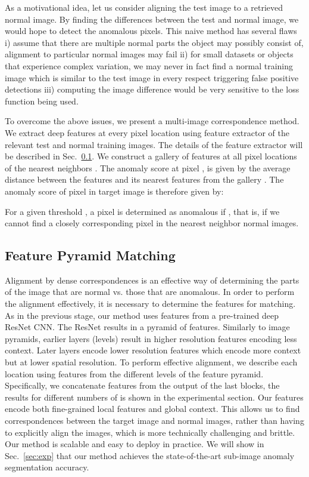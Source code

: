 \documentclass[runningheads]{llncs}
\begin{document}
As a motivational idea, let us consider aligning the test image to a retrieved normal image. By finding the differences between the test and normal image, we would hope to detect the anomalous pixels. This naive method has several flaws i) assume that there are multiple normal parts the object may possibly consist of, alignment to particular normal images may fail ii) for small datasets or objects that experience complex variation, we may never in fact find a normal training image which is similar to the test image in every respect triggering false positive detections  iii) computing the image difference would be very sensitive to the loss function being used.

To overcome the above issues, we present a multi-image correspondence method. We extract deep features at every pixel location  using feature extractor  of the relevant test and normal training images. The details of the feature extractor will be described in Sec.~\ref{sec:method:pyramid}. We construct a gallery of features at all pixel locations of the  nearest neighbors . The anomaly score at pixel , is given by the average distance between the features  and its  nearest features from the gallery . The anomaly score of pixel  in target image  is therefore given by:



For a given threshold , a pixel is determined as anomalous if , that is, if we cannot find a closely corresponding pixel in the  nearest neighbor normal images.  

\subsection{Feature Pyramid Matching} 
\label{sec:method:pyramid} 

Alignment by dense correspondences is an effective way of determining the parts of the image that are normal vs. those that are anomalous. In order to perform the alignment effectively, it is necessary to determine the features for matching. As in the previous stage, our method uses features from a pre-trained deep ResNet CNN. The ResNet results in a pyramid of features. Similarly to image pyramids, earlier layers (levels) result in higher resolution features encoding less context. Later layers encode lower resolution features which encode more context but at lower spatial resolution. To perform effective alignment, we describe each location using features from the different levels of the feature pyramid. Specifically, we concatenate features from the output of the last  blocks, the results for different numbers of  is shown in the experimental section. Our features encode both fine-grained local features and global context. This allows us to find correspondences between the target image and  normal images, rather than having to explicitly align the images, which is more technically challenging and brittle. Our method is scalable and easy to deploy in practice. We will show in Sec.~\ref{sec:exp} that our method achieves the state-of-the-art sub-image anomaly segmentation accuracy.
\end{document}
